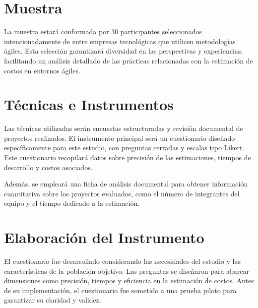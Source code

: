 \section{Muestra}

La muestra estará conformada por 30 participantes seleccionados intencionadamente de entre empresas tecnológicas que utilicen metodologías ágiles. Esta selección garantizará diversidad en las perspectivas y experiencias, facilitando un análisis detallado de las prácticas relacionadas con la estimación de costos en entornos ágiles.

\section{Técnicas e Instrumentos}

Las técnicas utilizadas serán encuestas estructuradas y revisión documental de proyectos realizados. El instrumento principal será un cuestionario diseñado específicamente para este estudio, con preguntas cerradas y escalas tipo Likert. Este cuestionario recopilará datos sobre precisión de las estimaciones, tiempos de desarrollo y costos asociados.

Además, se empleará una ficha de análisis documental para obtener información cuantitativa sobre los proyectos evaluados, como el número de integrantes del equipo y el tiempo dedicado a la estimación.

\section{Elaboración del Instrumento}

El cuestionario fue desarrollado considerando las necesidades del estudio y las características de la población objetivo. Las preguntas se diseñaron para abarcar dimensiones como precisión, tiempos y eficiencia en la estimación de costos. Antes de su implementación, el cuestionario fue sometido a una prueba piloto para garantizar su claridad y validez.
